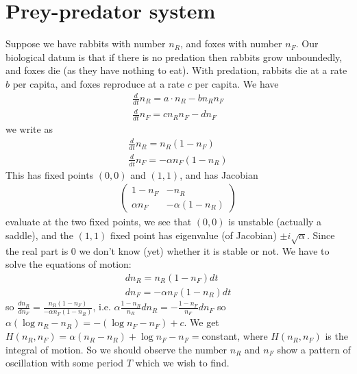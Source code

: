 \documentclass[a4paper]{article}
\begin{document}
\section{Prey-predator system}
Suppose we have rabbits with number $n_R$, and foxes with number $n_F$. Our biological datum is that if there is no predation then rabbits grow unboundedly, and foxes die (as they have nothing to eat). With predation, rabbits die at a rate $b$ per capita, and foxes reproduce at a rate $c$ per capita. We have
\begin{equation*}
\begin{aligned}
\frac{d}{dt} n_R = a \cdot n_R - b n_R n_F\\
\frac{d}{dt} n_F = c n_R n_F - dn_F
\end{aligned}
\end{equation*}
we write as
\begin{equation*}
\begin{aligned}
\frac{d}{dt} n_R = n_R (1-n_F)\\
\frac{d}{dt} n_F = -\alpha n_F (1-n_R)
\end{aligned}
\end{equation*}
This has fixed points $(0,0)$ and $(1,1)$, and has Jacobian
\begin{equation*}
\begin{aligned}
\begin{pmatrix}
1-n_F & -n_R\\
\alpha n_F & -\alpha(1-n_R)
\end{pmatrix}
\end{aligned}
\end{equation*}
evaluate at the two fixed points, we see that $(0,0)$ is unstable (actually a saddle), and the $(1,1)$ fixed point has eigenvalue (of Jacobian) $\pm i\sqrt{\alpha}$. Since the real part is 0 we don't know (yet) whether it is stable or not. We have to solve the equations of motion:
\begin{equation*}
\begin{aligned}
d n_R = n_R (1-n_F) dt\\
d n_F = -\alpha n_F (1-n_R) dt
\end{aligned}
\end{equation*}
so $\frac{d n_R}{dn_F} = \frac{n_R (1-n_F)}{-\alpha n_F(1-n_R)}$, i.e. $\alpha \frac{1-n_R}{n_R} dn_R = -\frac{1-n_F}{n_F} dn_F$ so $\alpha(\log n_R - n_R) = -(\log n_F - n_F) + c$. We get $H(n_R,n_F) = \alpha(n_R - n_R) + \log n_F - n_F = $constant, where $H(n_R,n_F)$ is the integral of motion. So we should observe the number $n_R$ and $n_F$ show a pattern of oscillation with some period $T$ which we wish to find.
\end{document}

